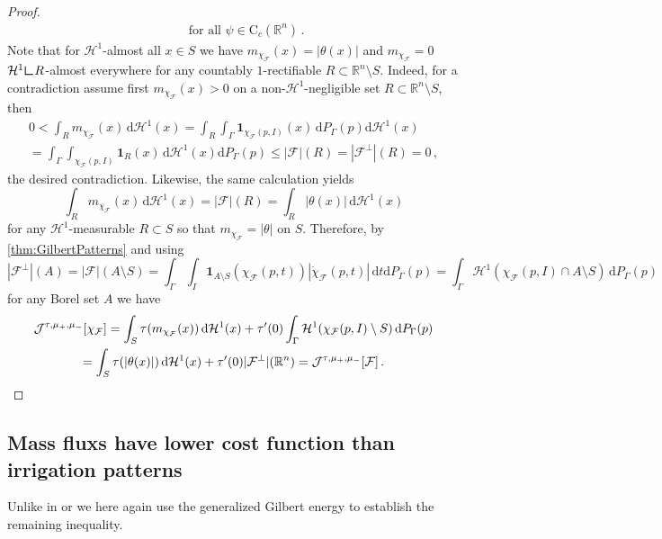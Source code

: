 \documentclass[10pt,a4paper,oneside,final]{article}
\newcommand{\R}{{\mathbb{R}}}
\newcommand{\de}{{\mathrm{d}}}
\newcommand{\setchar}[1]{\mathbf{1}_{#1}}
\newcommand{\hdone}{\mathcal{H}^1}
\newcommand{\restr}{{\mbox{\LARGE$\llcorner$}}}
\newcommand{\cont}{{\mathrm{C}}}
\newcommand{\flux}{{\mathcal{F}}}
\newcommand{\reSpace}{\Gamma}
\newcommand{\reMeasure}{P_{\reSpace}}
\newcommand{\JEn}{{\mathcal{J}}}
\newcommand{\TransportPath}{Mass flux}
\numberwithin{equation}{section}
\theoremstyle{plain}
\theoremstyle{definition}
\theoremstyle{remark}
\begin{document}
\begin{proof}
\begin{align*}
\qquad\text{for all }\psi\in\cont_c(\R^n)\,.
\end{align*}
Note that for $\hdone$-almost all $x\in S$ we have $m_{\chi_\flux}(x)=|\theta(x)|$ and $m_{\chi_\flux}=0$ $\hdone\restr R$-almost everywhere for any countably $1$-rectifiable $R\subset\R^n\setminus S$.
Indeed, for a contradiction assume first $m_{\chi_\flux}(x)>0$ on a non-$\hdone$-negligible set $R\subset\R^n\setminus S$, then
\begin{multline*}
0
<\int_Rm_{\chi_\flux}(x)\,\de\hdone(x)
=\int_R\int_\Gamma\setchar{\chi_\flux(p,I)}(x)\,\de\reMeasure(p)\de\hdone(x)\\
=\int_\Gamma\int_{\chi_\flux(p,I)}\setchar{R}(x)\,\de\hdone(x)\de\reMeasure(p)
\leq|\flux|(R)
=|\flux^\perp|(R)
=0\,,
\end{multline*}
the desired contradiction. Likewise, the same calculation yields
\begin{equation*}
\int_Rm_{\chi_\flux}(x)\,\de\hdone(x)
=|\flux|(R)
=\int_R|\theta(x)|\,\de\hdone(x)
\end{equation*}
for any $\hdone$-measurable $R\subset S$ so that $m_{\chi_\flux}=|\theta|$ on $S$.
Therefore, by \cref{thm:GilbertPatterns} and using
\begin{equation*}
|\flux^\perp|(A)
=|\flux|(A\setminus S)
=\int_\reSpace\int_I\setchar{A\setminus S}(\chi_\flux(p,t))|\dot\chi_\flux(p,t)|\,\de t\de\reMeasure(p)
=\int_\reSpace\hdone(\chi_\flux(p,I)\cap A\setminus S)\,\de\reMeasure(p)
\end{equation*}
for any Borel set $A$ we have
\begin{multline*}
\JEn^{\tau,\mu_+,\mu_-}[\chi_\flux]
=\int_S\tau(m_{\chi_\flux}(x))\,\de\hdone(x)+\tau'(0)\int_\reSpace\hdone(\chi_\flux(p,I)\setminus S)\,\de\reMeasure(p)\\
=\int_{S}\tau(|\theta(x)|)\,\de\hdone(x)+\tau'(0)|\flux^\perp|(\R^n)
=\JEn^{\tau,\mu_+,\mu_-}[\flux]\,.\qedhere
\end{multline*}
\end{proof}

\subsection{\TransportPath{}s have lower cost function than irrigation patterns}
Unlike in \cite{BrWi15-equivalent} or \cite{Maddalena-Solimini-Transport-Distances,Maddalena-Solimini-Synchronic} we here again use the generalized Gilbert energy to establish the remaining inequality.
\end{document}
